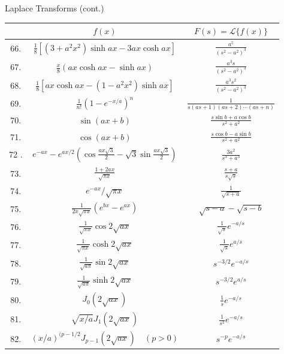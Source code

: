 \documentclass[10pt]{article}
\begin{document}
Laplace Transforms (cont.)

\begin{center}
\begin{tabular}{|c|c|c|}
\hline
 & $f(x)$ & $F(s)=\mathscr{L}\{f(x)\}$ \\
\hline
66. & $\frac{1}{8}\left[\left(3+a^{2} x^{2}\right) \sinh a x-3 a x \cosh a x\right]$ & $\frac{a^{5}}{\left(s^{2}-a^{2}\right)^{3}}$ \\
\hline
67. & $\frac{x}{8}(a x \cosh a x-\sinh a x)$ & $\frac{a^{3} s}{\left(s^{2}-a^{2}\right)^{3}}$ \\
\hline
68. & $\frac{1}{8}\left[a x \cosh a x-\left(1-a^{2} x^{2}\right) \sinh a x\right]$ & $\frac{a^{3} s^{2}}{\left(s^{2}-a^{2}\right)^{3}}$ \\
\hline
69. & $\frac{1}{n !}\left(1-e^{-x / a}\right)^{n}$ & $\frac{1}{s(a s+1)(a s+2) \cdots(a s+n)}$ \\
\hline
70. & $\sin (a x+b)$ & $\frac{s \sin b+a \cos b}{s^{2}+a^{2}}$ \\
\hline
71. & $\cos (a x+b)$ & $\frac{s \cos b-a \sin b}{s^{2}+a^{2}}$ \\
\hline
72 . & $e^{-a x}-e^{a x / 2}\left(\cos \frac{a x \sqrt{3}}{2}-\sqrt{3} \sin \frac{a x \sqrt{3}}{2}\right)$ & $\frac{3 a^{2}}{s^{3}+a^{3}}$ \\
\hline
73. & $\frac{1+2 a x}{\sqrt{\pi x}}$ & $\frac{s+a}{s \sqrt{s}}$ \\
\hline
74. & $e^{-a x} / \sqrt{\pi x}$ & $\frac{1}{\sqrt{s+a}}$ \\
\hline
75. & $\frac{1}{2 x \sqrt{\pi x}}\left(e^{b x}-e^{a x}\right)$ & $\sqrt{s-a}-\sqrt{s-b}$ \\
\hline
76. & $\frac{1}{\sqrt{\pi x}} \cos 2 \sqrt{a x}$ & $\frac{1}{\sqrt{s}} e^{-a / s}$ \\
\hline
77. & $\frac{1}{\sqrt{\pi x}} \cosh 2 \sqrt{a x}$ & $\frac{1}{\sqrt{s}} e^{a / s}$ \\
\hline
78. & $\frac{1}{\sqrt{a \pi}} \sin 2 \sqrt{a x}$ & $s^{-3 / 2} e^{-a / s}$ \\
\hline
79. & $\frac{1}{\sqrt{a \pi}} \sinh 2 \sqrt{a x}$ & $s^{-3 / 2} e^{a / s}$ \\
\hline
80. & $J_{0}(2 \sqrt{a x})$ & $\frac{1}{s} e^{-a / s}$ \\
\hline
81. & $\sqrt{x / a} J_{1}(2 \sqrt{a x})$ & $\frac{1}{s^{2}} e^{-a / s}$ \\
\hline
82. & $(x / a)^{(p-1 / 2} J_{p-1}(2 \sqrt{a x}) \quad(p>0)$ & $s^{-p} e^{-a / s}$ \\
\hline
\end{tabular}
\end{center}
\end{document}
